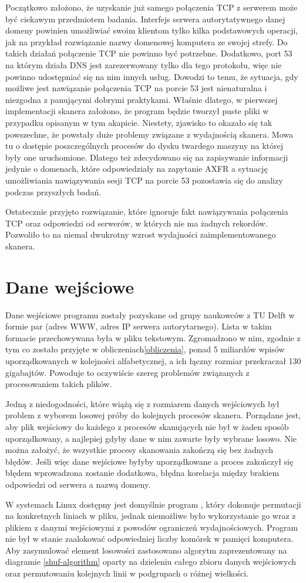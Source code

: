 Początkowo założono, że uzyskanie już samego połączenia TCP z serwerem może być ciekawym przedmiotem badania. Interfejs serwera autorytatywnego danej domeny powinien umożliwiać swoim klientom tylko kilka podstawowych operacji, jak na przykład rozwiązanie nazwy domenowej komputera ze swojej strefy. Do takich działań połączenie TCP nie powinno być potrzebne. Dodatkowo, port 53 na którym działa DNS jest zarezerwowany tylko dla tego protokołu, więc nie powinno udostępniać się na nim innych usług. Dowodzi to temu, że sytuacja, gdy możliwe jest nawiązanie połączenia TCP na porcie 53 jest nienaturalna i niezgodna z panującymi dobrymi praktykami. Właśnie dlatego, w pierwszej implementacji skanera założono, że program będzie tworzył puste pliki w przypadku opisanym w tym akapicie. Niestety, zjawisko to okazało się tak powszechne, że powstały duże problemy związane z wydajnością skanera. Mowa tu o dostępie poszczególnych procesów do dysku twardego maszyny na której były one uruchomione. Dlatego też zdecydowano się na zapisywanie informacji jedynie o domenach, które odpowiedziały na zapytanie AXFR a sytuację umożliwiania nawiązywania sesji TCP na porcie 53 pozostawia się do analizy podczas przyszłych badań.

Ostatecznie przyjęto rozwiązanie, które ignoruje fakt nawiązywania połączenia TCP oraz odpowiedzi od serwerów, w których nie ma żadnych rekordów. Pozwoliło to na niemal dwukrotny wzrost wydajności zaimplementowanego skanera.

\section{Dane wejściowe}
Dane wejściowe programu zostały pozyskane od grupy naukowców z TU Delft\cite{deflt} w formie par (adres WWW, adres IP serwera autorytarnego). Lista w takim formacie przechowywana była w pliku tekstowym. Zgromadzono w nim, zgodnie z tym co zostało przyjęte w obliczeniach\ref{obliczenia}, ponad 5 miliardów wpisów uporządkowanych w kolejności alfabetycznej, a ich łączny rozmiar przekraczał 130 gigabajtów. Powoduje to oczywiście szereg problemów związanych z procesowaniem takich plików. 

Jedną z niedogodności, które wiążą się z rozmiarem danych wejściowych był problem z wyborem losowej próby do kolejnych procesów skanera. Porządane jest, aby plik wejściowy do każdego z procesów skanujących nie był w żaden sposób uporządkowany, a najlepiej gdyby dane w nim zawarte były wybrane losowo. Nie można założyć, że wszystkie procesy skanowania zakończą się bez żadnych błędów. Jeśli więc dane wejściowe byłyby uporządkowane a proces zakończył się błędem wprowadzona zostanie dodatkowa, błędna korelacja między brakiem odpowiedzi od serwera a nazwą domeny.

W systemach Linux dostępny jest domyślnie program \cite{shuf}, który dokonuje permutacji na konkretnych liniach w pliku, jednak niemożliwe było wykorzystanie go wraz z plikiem z danymi wejściowymi z powodów ograniczeń wydajnościowych. Program nie był w stanie zaalokować odpowiedniej liczby komórek w pamięci komputera. Aby zasymulować element losowości zastosowano algorytm zaprezentowany na diagramie \ref{shuf-algorithm} oparty na dzieleniu całego zbioru danych wejściowych oraz permutowaniu kolejnych linii w podgrupach o różnej wielkości.